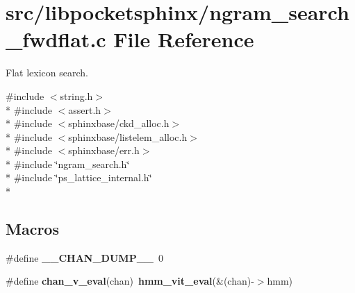 \section{src/libpocketsphinx/ngram\+\_\+search\+\_\+fwdflat.c File Reference}
\label{ngram__search__fwdflat_8c}


Flat lexicon search.  


{\ttfamily \#include $<$string.\+h$>$}\\*
{\ttfamily \#include $<$assert.\+h$>$}\\*
{\ttfamily \#include $<$sphinxbase/ckd\+\_\+alloc.\+h$>$}\\*
{\ttfamily \#include $<$sphinxbase/listelem\+\_\+alloc.\+h$>$}\\*
{\ttfamily \#include $<$sphinxbase/err.\+h$>$}\\*
{\ttfamily \#include \char`\"{}ngram\+\_\+search.\+h\char`\"{}}\\*
{\ttfamily \#include \char`\"{}ps\+\_\+lattice\+\_\+internal.\+h\char`\"{}}\\*
\subsection*{Macros}
\begin{DoxyCompactItemize}
\item 
\#define {\bfseries \+\_\+\+\_\+\+C\+H\+A\+N\+\_\+\+D\+U\+M\+P\+\_\+\+\_\+}~0\label{ngram__search__fwdflat_8c_a58360b0a332f35742f89edce94c649aa}

\item 
\#define {\bfseries chan\+\_\+v\+\_\+eval}(chan)~{\bf hmm\+\_\+vit\+\_\+eval}(\&(chan)-\/$>$hmm)\label{ngram__search__fwdflat_8c_a268c1fbc6483e1ab06c007222f08d9ad}

\end{DoxyCompactItemize}
